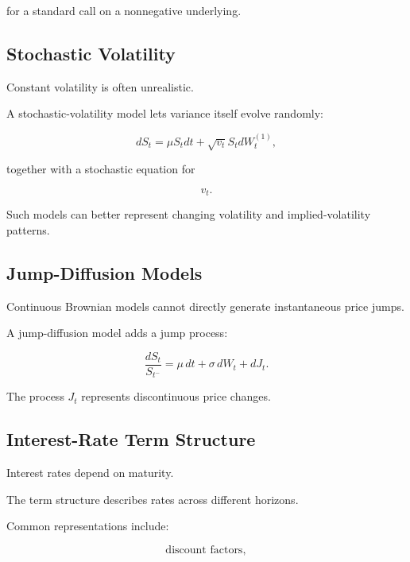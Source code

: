 for a standard call on a nonnegative underlying.

\subsection{Stochastic Volatility}
\label{subsec:stochastic-volatility}

Constant volatility is often unrealistic.

A stochastic-volatility model lets variance itself evolve randomly:

\[
\boxed{
dS_t
=
\mu S_tdt
+
\sqrt{v_t}S_tdW_t^{(1)},
}
\]

together with a stochastic equation for

\[
\boxed{
v_t.
}
\]

Such models can better represent changing volatility and implied-volatility
patterns.

\subsection{Jump-Diffusion Models}
\label{subsec:jump-diffusion-models}

Continuous Brownian models cannot directly generate instantaneous price
jumps.

A jump-diffusion model adds a jump process:

\[
\boxed{
\frac{dS_t}{S_{t^-}}
=
\mu\,dt
+
\sigma\,dW_t
+
dJ_t.
}
\]

The process \(J_t\) represents discontinuous price changes.

\subsection{Interest-Rate Term Structure}
\label{subsec:interest-rate-term-structure}

Interest rates depend on maturity.

The term structure describes rates across different horizons.

Common representations include:

\[
\boxed{
\text{discount factors},
}
\]

